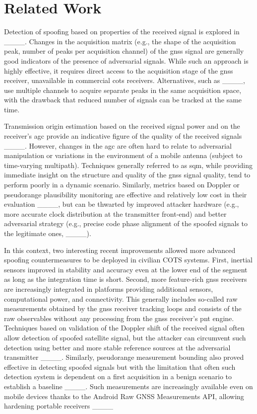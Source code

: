 \section{Related Work}
\label{sec:related_work}
Detection of spoofing based on properties of the received signal is explored in ____. Changes in the acquisition matrix (e.g., the shape of the acquisition peak, number of peaks per acquisition channel) of the \gls{gnss} signal are generally good indicators of the presence of adversarial signals. While such an approach is highly effective, it requires direct access to the acquisition stage of the \gls{gnss} receiver, unavailable in commercial \gls{cots} receivers. Alternatives, such as ____, use multiple channels to acquire separate peaks in the same acquisition space, with the drawback that reduced number of signals can be tracked at the same time. 

Transmission origin estimation based on the received signal power and on the receiver's \gls{agc} provide an indicative figure of the quality of the received signals ____. However, changes in the \gls{agc} are often hard to relate to adversarial manipulation or variations in the environment of a mobile antenna (subject to time-varying multipath). Techniques generally referred to as \gls{sqm}, while providing immediate insight on the structure and quality of the \gls{gnss} signal quality, tend to perform poorly in a dynamic scenario. Similarly, metrics based on Doppler or pseudorange plausibility monitoring are effective and relatively low cost in their evaluation ____, but can be thwarted by improved attacker hardware (e.g., more accurate clock distribution at the transmitter front-end) and better adversarial strategy (e.g., precise code phase alignment of the spoofed signals to the legitimate ones, ____). 

In this context, two interesting recent improvements allowed more advanced spoofing countermeasures to be deployed in civilian COTS systems. First, inertial sensors improved in stability and accuracy even at the lower end of the segment as long as the integration time is short. Second, more feature-rich \gls{gnss} receivers are increasingly integrated in platforms providing additional sensors, computational power, and connectivity. %
This generally includes so-called raw measurements obtained by the \gls{gnss} receiver tracking loops and consists of the raw observables without any processing from the \gls{gnss} receiver's \gls{pnt} engine. Techniques based on validation of the Doppler shift of the received signal often allow detection of spoofed satellite signal, but the attacker can circumvent such detection using better and more stable reference sources at the adversarial transmitter ____. Similarly, pseudorange measurement bounding also proved effective in detecting spoofed signals but with the limitation that often such detection system is dependent on a first acquisition in a benign scenario to establish a baseline ____. Such measurements are increasingly available even on mobile devices thanks to the Android Raw GNSS Measurements API, allowing hardening portable receivers ____

